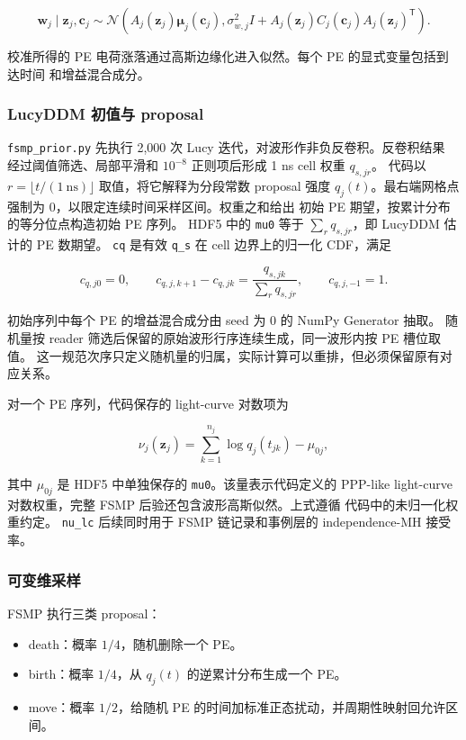 \documentclass[UTF8,a4paper,11pt]{ctexart}
\providecommand{\tightlist}{%
  \setlength{\itemsep}{0pt}\setlength{\parskip}{0pt}}
\begin{document}
\[
\mathbf w_j\mid \mathbf z_j,\mathbf c_j
\sim
\mathcal N\!\left(
A_j(\mathbf z_j)\boldsymbol\mu_j(\mathbf c_j),
\sigma_{w,j}^2 I +
A_j(\mathbf z_j)C_j(\mathbf c_j)A_j(\mathbf z_j)^{\mathsf T}
\right).
\]

校准所得的 PE 电荷涨落通过高斯边缘化进入似然。每个 PE 的显式变量包括到达时间
和增益混合成分。

\subsubsection{LucyDDM 初值与 proposal}

\texttt{fsmp\_prior.py} 先执行 2,000 次 Lucy 迭代，对波形作非负反卷积。反卷积结果
经过阈值筛选、局部平滑和 \(10^{-8}\) 正则项后形成 1 ns cell 权重 \(q_{s,jr}\)。
代码以 \(r=\lfloor t/(1\ \mathrm{ns})\rfloor\) 取值，将它解释为分段常数 proposal
强度 \(q_j(t)\)。最右端网格点强制为 0，以限定连续时间采样区间。权重之和给出
初始 PE 期望，按累计分布的等分位点构造初始 PE 序列。
HDF5 中的 \texttt{mu0} 等于 \(\sum_r q_{s,jr}\)，即 LucyDDM 估计的 PE 数期望。
\texttt{cq} 是有效 \texttt{q\_s} 在 cell 边界上的归一化 CDF，满足

\[
c_{q,j0}=0,
\qquad
c_{q,j,k+1}-c_{q,jk}
=\frac{q_{s,jk}}{\sum_r q_{s,jr}},
\qquad
c_{q,j,-1}=1.
\]

初始序列中每个 PE 的增益混合成分由 seed 为 0 的 NumPy Generator 抽取。
随机量按 reader 筛选后保留的原始波形行序连续生成，同一波形内按 PE 槽位取值。
这一规范次序只定义随机量的归属，实际计算可以重排，但必须保留原有对应关系。

对一个 PE 序列，代码保存的 light-curve 对数项为

\[
\nu_j(\mathbf z_j)
=\sum_{k=1}^{n_j}\log q_j(t_{jk})-\mu_{0j},
\]

其中 \(\mu_{0j}\) 是 HDF5 中单独保存的 \texttt{mu0}。该量表示代码定义的
PPP-like light-curve 对数权重，完整 FSMP 后验还包含波形高斯似然。上式遵循
代码中的未归一化权重约定。
\texttt{nu\_lc} 后续同时用于 FSMP 链记录和事例层的 independence-MH 接受率。

\subsubsection{可变维采样}

FSMP 执行三类 proposal：

\begin{itemize}
\tightlist
\item
  death：概率 \(1/4\)，随机删除一个 PE。
\item
  birth：概率 \(1/4\)，从 \(q_j(t)\) 的逆累计分布生成一个 PE。
\item
  move：概率 \(1/2\)，给随机 PE 的时间加标准正态扰动，并周期性映射回允许区间。
\end{itemize}
\end{document}
